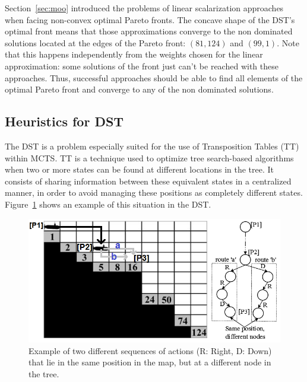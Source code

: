 \documentclass[journal]{IEEEtran}
\begin{document}
Section~\ref{sec:moo} introduced the problems of linear scalarization approaches when facing non-convex optimal Pareto fronts. The concave shape of the DST's optimal front means that those approximations converge to the non dominated solutions located at the edges of the Pareto front: $(81,124)$ and $(99,1)$. Note that this happens independently from the weights chosen for the linear approximation: some solutions of the front just can't be reached with these approaches. Thus, successful approaches should be able to find all elements of the optimal Pareto front and converge to any of the non dominated solutions.

\subsection{Heuristics for DST} \label{ssec:heurDST}

The DST is a problem especially suited for the use of Transposition Tables (TT)~\cite{Childs2008} within MCTS. TT is a technique used to optimize tree search-based algorithms when two or more states can be found at different locations in the tree. It consists of sharing information between these equivalent states in a centralized manner, in order to avoid managing these positions as completely different states. Figure~\ref{fig:dstTable} shows an example of this situation in the DST.

\begin{figure}[!t]
\begin{center}
\includegraphics[width=0.9\columnwidth]{figures/perez7}
\end{center}
\caption{Example of two different sequences of actions (R: Right, D: Down) that lie in the same position in the map, but at a different node in the tree.}
\label{fig:dstTable}
\end{figure}
\end{document}
